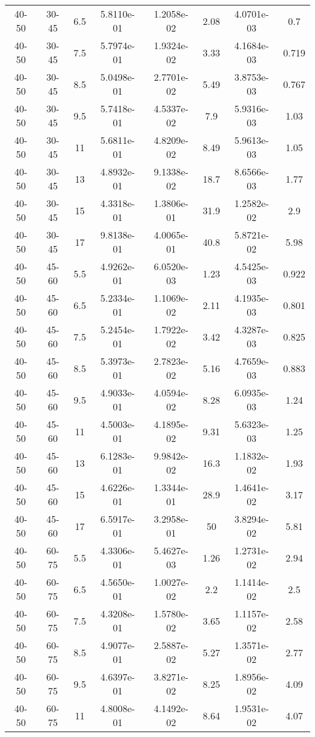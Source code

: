 \begin{longtable}{|cccccccc|}
40-50 & 30-45 & 6.5 & 5.8110e-01 & 1.2058e-02 & 2.08 & 4.0701e-03 & 0.7 \\ 
40-50 & 30-45 & 7.5 & 5.7974e-01 & 1.9324e-02 & 3.33 & 4.1684e-03 & 0.719 \\ 
40-50 & 30-45 & 8.5 & 5.0498e-01 & 2.7701e-02 & 5.49 & 3.8753e-03 & 0.767 \\ 
40-50 & 30-45 & 9.5 & 5.7418e-01 & 4.5337e-02 & 7.9 & 5.9316e-03 & 1.03 \\ 
40-50 & 30-45 & 11 & 5.6811e-01 & 4.8209e-02 & 8.49 & 5.9613e-03 & 1.05 \\ 
40-50 & 30-45 & 13 & 4.8932e-01 & 9.1338e-02 & 18.7 & 8.6566e-03 & 1.77 \\ 
40-50 & 30-45 & 15 & 4.3318e-01 & 1.3806e-01 & 31.9 & 1.2582e-02 & 2.9 \\ 
40-50 & 30-45 & 17 & 9.8138e-01 & 4.0065e-01 & 40.8 & 5.8721e-02 & 5.98 \\ 
\hline
40-50 & 45-60 & 5.5 & 4.9262e-01 & 6.0520e-03 & 1.23 & 4.5425e-03 & 0.922 \\ 
40-50 & 45-60 & 6.5 & 5.2334e-01 & 1.1069e-02 & 2.11 & 4.1935e-03 & 0.801 \\ 
40-50 & 45-60 & 7.5 & 5.2454e-01 & 1.7922e-02 & 3.42 & 4.3287e-03 & 0.825 \\ 
40-50 & 45-60 & 8.5 & 5.3973e-01 & 2.7823e-02 & 5.16 & 4.7659e-03 & 0.883 \\ 
40-50 & 45-60 & 9.5 & 4.9033e-01 & 4.0594e-02 & 8.28 & 6.0935e-03 & 1.24 \\ 
40-50 & 45-60 & 11 & 4.5003e-01 & 4.1895e-02 & 9.31 & 5.6323e-03 & 1.25 \\ 
40-50 & 45-60 & 13 & 6.1283e-01 & 9.9842e-02 & 16.3 & 1.1832e-02 & 1.93 \\ 
40-50 & 45-60 & 15 & 4.6226e-01 & 1.3344e-01 & 28.9 & 1.4641e-02 & 3.17 \\ 
40-50 & 45-60 & 17 & 6.5917e-01 & 3.2958e-01 & 50 & 3.8294e-02 & 5.81 \\ 
\hline
40-50 & 60-75 & 5.5 & 4.3306e-01 & 5.4627e-03 & 1.26 & 1.2731e-02 & 2.94 \\ 
40-50 & 60-75 & 6.5 & 4.5650e-01 & 1.0027e-02 & 2.2 & 1.1414e-02 & 2.5 \\ 
40-50 & 60-75 & 7.5 & 4.3208e-01 & 1.5780e-02 & 3.65 & 1.1157e-02 & 2.58 \\ 
40-50 & 60-75 & 8.5 & 4.9077e-01 & 2.5887e-02 & 5.27 & 1.3571e-02 & 2.77 \\ 
40-50 & 60-75 & 9.5 & 4.6397e-01 & 3.8271e-02 & 8.25 & 1.8956e-02 & 4.09 \\ 
40-50 & 60-75 & 11 & 4.8008e-01 & 4.1492e-02 & 8.64 & 1.9531e-02 & 4.07 \\ 

\end{longtable}
